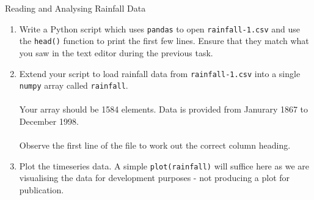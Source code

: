 \documentclass{lab}
\begin{document}
\begin{task}{Reading and Analysing Rainfall Data}{}
\begin{enumerate}
\begin{itemize}
\begin{itemize}
	\end{itemize}
\item Reference it with an absolute file path. The complication with this method is that the \texttt{\textbackslash} character, when used in a Python string, indicates an ``escape sequence''. For example \texttt{\textbackslash n} is a special character which prints a new line.
\\~\\
As such, the \texttt{\textbackslash} characters in the file path need to be ``escaped'' by placing an \textit{additional} \texttt{\textbackslash} before them. eg: \texttt{C:\textbackslash\textbackslash Users\textbackslash \textbackslash me\textbackslash \textbackslash Downloads\textbackslash \textbackslash rainfall-1.csv}.
\end{itemize}
\item Write a Python script which uses \texttt{pandas} to open \texttt{rainfall-1.csv} and use the \texttt{head()} function to print the first few lines. Ensure that they match what you saw in the text editor during the previous task.
\item Extend your script to load rainfall data from \texttt{rainfall-1.csv} into a single \texttt{numpy} array called \texttt{rainfall}.
\\~\\
Your array should be 1584 elements. Data is provided from Janurary 1867 to December 1998.
\\~\\
Observe the first line of the file to work out the correct column heading.
\item Plot the timeseries data. A simple \texttt{plot(rainfall)} will suffice here as we are visualising the data for development purposes - not producing a plot for publication.


\end{enumerate}
\end{task}
\end{document}
